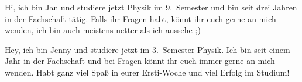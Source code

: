 \begin{multicols*}{2}
{Hi, ich bin Jan und studiere jetzt Physik im 9.~Semester und bin seit drei Jahren in der Fachschaft tätig.
Falls ihr Fragen habt, könnt ihr euch gerne an mich wenden, ich bin auch meistens netter als ich aussehe ;)
\vspace{\baselineskip}}


{Hey, ich bin Jenny und studiere jetzt im 3.~Semester Physik.
Ich bin seit einem Jahr in der Fachschaft und bei Fragen könnt ihr euch immer gerne an mich wenden.
Habt ganz viel Spaß in eurer Ersti-Woche und viel Erfolg im Studium!}


\end{multicols*}
